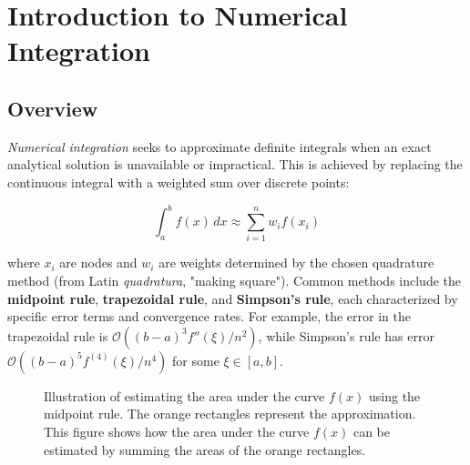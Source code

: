 \chapter{Introduction to Numerical Integration}
\label{chap:intro-numint}
\section{Overview}
\emph{Numerical integration} seeks to approximate definite integrals when an exact analytical solution is unavailable or impractical. This is achieved by replacing the continuous integral with a weighted sum over discrete points:

\begin{equation}
\int_a^b f(x) \, dx \approx \sum_{i=1}^n w_i f(x_i)
\end{equation}

where \(x_i\) are nodes and \(w_i\) are weights determined by the chosen quadrature method (from Latin \emph{quadratura}, "making square").
Common methods include the \textbf{midpoint rule}, \textbf{trapezoidal rule}, and \textbf{Simpson's rule}, each characterized by specific error terms and convergence rates. For example, the error in the trapezoidal rule is \(\mathcal{O}((b-a)^3 f''(\xi)/n^2)\), while Simpson's rule has error \(\mathcal{O}((b-a)^5 f^{(4)}(\xi)/n^4)\) for some \(\xi \in [a,b]\).

\begin{figure}[h!]
  \centering
  \caption{Illustration of estimating the area under the curve \(f(x)\) using the midpoint rule. The orange rectangles represent the approximation. This figure shows how the area under the curve \(f(x)\) can be estimated by summing the areas of the orange rectangles.}
  \label{fig:numint-midpoint}
\end{figure}

